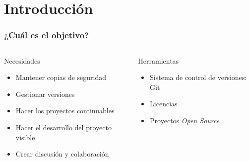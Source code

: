 \section*{Introducción}

\begin{frame}\frametitle{¿Cuál es el objetivo?}
\begin{columns}[T]
\begin{column}{.55\textwidth}
    \begin{block}{Necesidades}
        \begin{itemize}
            \item Mantener copias de seguridad
            \item Gestionar versiones
            \item Hacer los proyectos continuables
            \item Hacer el desarrollo del proyecto visible
            \item Crear discusión y colaboración
        \end{itemize}
    \end{block}
\end{column}

\begin{column}{.4\textwidth}
    \begin{block}{Herramientas}
        \begin{itemize}
            \item Sistema de control de versiones: Git
            \item Licencias
            \item Proyectos \textit{Open Source}
        \end{itemize}
    \end{block}
\end{column}
\end{columns}
\end{frame}

